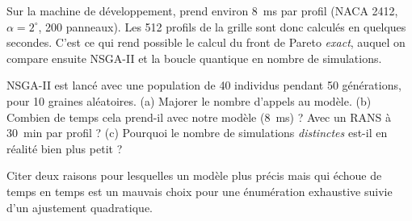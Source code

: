 \begin{projet}
Sur la machine de développement,  prend environ 8~ms par profil (NACA 2412, $\alpha=2^\circ$, 200 panneaux). Les 512 profils de la grille sont donc calculés en quelques secondes. C'est ce qui rend possible le calcul du front de Pareto \emph{exact}, auquel on compare ensuite NSGA-II et la boucle quantique en nombre de simulations.
\end{projet}

\exercices
\begin{exercice}
NSGA-II est lancé avec une population de 40 individus pendant 50 générations, pour 10 graines aléatoires. (a) Majorer le nombre d'appels au modèle. (b) Combien de temps cela prend-il avec notre modèle (8~ms) ? Avec un RANS à 30~min par profil ? (c) Pourquoi le nombre de simulations \emph{distinctes} est-il en réalité bien plus petit ?
\end{exercice}
\begin{exercice}
Citer deux raisons pour lesquelles un modèle plus précis mais qui échoue de temps en temps est un mauvais choix pour une énumération exhaustive suivie d'un ajustement quadratique.
\end{exercice}
